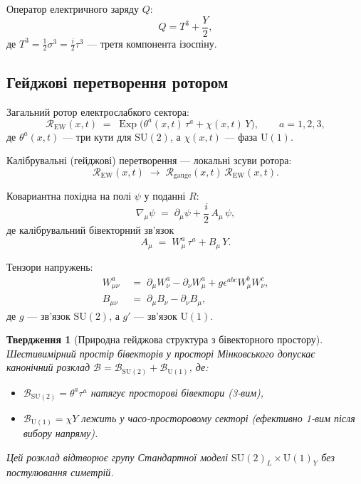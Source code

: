\documentclass[11pt,a4paper]{article}
\newcommand{\Exp}{\operatorname{Exp}}
\newcommand{\Rotor}{\mathcal{R}}
\newcommand{\Biv}{\mathcal{B}}
\newcommand{\D}{\nabla}                        %
\newcommand{\SU}{\mathrm{SU}}
\newcommand{\UU}{\mathrm{U}}
\theoremstyle{definition}
\theoremstyle{plain}
\newtheorem{proposition}{Твердження}
\theoremstyle{remark}
\begin{document}
Оператор електричного заряду $Q$:
\begin{equation}
  Q = T^3 + \frac{Y}{2},
\end{equation}
де $T^3 = \frac{1}{2}\sigma^3 = \frac{i}{2}\tau^3$ — третя компонента ізоспіну.

\subsection{Гейджові перетворення ротором}

Загальний ротор електрослабкого сектора:
\begin{equation}
  \Rotor_{\text{EW}}(x,t) \;=\; \Exp\!\big(\theta^a(x,t)\,\tau^a + \chi(x,t)\,Y\big),
  \qquad a=1,2,3,
\end{equation}
де $\theta^a(x,t)$ — три кути для $\SU(2)$, а $\chi(x,t)$ — фаза $\UU(1)$.

Калібрувальні (гейджові) перетворення — локальні зсуви ротора:
\begin{equation}
  \Rotor_{\text{EW}}(x,t) \;\to\; \Rotor_{\text{gauge}}(x,t)\, \Rotor_{\text{EW}}(x,t).
\end{equation}

Ковариантна похідна на полі $\psi$ у поданні $R$:
\begin{equation}
  \D_\mu \psi \;=\; \partial_\mu \psi + \frac{i}{2}\,A_\mu\,\psi,
\end{equation}
де калібрувальний бівекторний зв’язок
\begin{equation}
  A_\mu \;=\; W_\mu^a\,\tau^a + B_\mu\,Y.
\end{equation}

Тензори напружень:
\begin{align}
  W_{\mu\nu}^a &\;=\; \partial_\mu W_\nu^a - \partial_\nu W_\mu^a + g\epsilon^{abc}W_\mu^b W_\nu^c, \\
  B_{\mu\nu} &\;=\; \partial_\mu B_\nu - \partial_\nu B_\mu,
\end{align}
де $g$ — зв’язок $\SU(2)$, а $g'$ — зв’язок $\UU(1)$.

\begin{proposition}[Природна гейджова структура з бівекторного простору]
Шестивимірний простір бівекторів у просторі Мінковського допускає канонічний розклад $\Biv = \Biv_{\SU(2)} + \Biv_{\UU(1)}$, де:
\begin{itemize}
  \item $\Biv_{\SU(2)} = \theta^a \tau^a$ натягує просторові бівектори (3-вим),
  \item $\Biv_{\UU(1)} = \chi Y$ лежить у часо-просторовому секторі (ефективно 1-вим після вибору напряму).
\end{itemize}
Цей розклад відтворює групу Стандартної моделі $\SU(2)_L \times \UU(1)_Y$ без постулювання симетрій.
\end{proposition}
\end{document}

